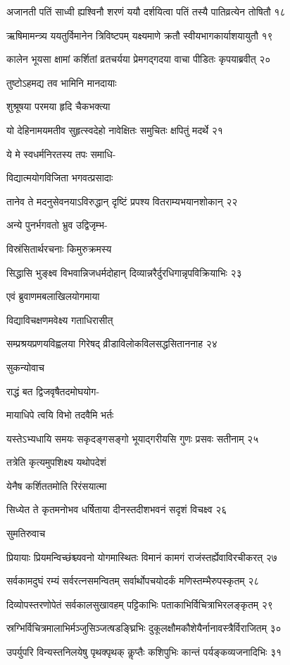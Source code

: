 अजानती पतिं साध्वी ह्यश्विनौ शरणं ययौ
दर्शयित्वा पतिं तस्यै पातिव्रत्येन तोषितौ १८

ऋषिमामन्त्र्य ययतुर्विमानेन त्रिविष्टपम्
यक्ष्यमाणे क्रतौ स्वीयभागकार्याशयायुतौ १९

कालेन भूयसा क्षामां कर्शितां व्रतचर्यया
प्रेमगद्गदया वाचा पीडितः कृपयाब्रवीत् २०

तुष्टोऽहमद्य तव भामिनि मानदायाः

शुश्रूषया परमया हृदि चैकभक्त्या

यो देहिनामयमतीव सुहृत्स्वदेहो
नावेक्षितः समुचितः क्षपितुं मदर्थे २१

ये मे स्वधर्मनिरतस्य तपः समाधि-

विद्यात्मयोगविजिता भगवत्प्रसादाः

तानेव ते मदनुसेवनयाऽविरुद्धान्
दृष्टिं प्रपश्य वितराम्यभयानशोकान् २२

अन्ये पुनर्भगवतो भ्रुव उद्विजृम्भ-

विस्रंसितार्थरचनाः किमुरुक्रमस्य

सिद्धासि भुङ्क्ष्व विभवान्निजधर्मदोहान्
दिव्यान्नरैर्दुरधिगान्नृपविक्रियाभिः २३

एवं ब्रुवाणमबलाखिलयोगमाया

विद्याविचक्षणमवेक्ष्य गताधिरासीत्

सम्प्रश्रयप्रणयविह्वलया गिरेषद्
व्रीडाविलोकविलसद्धसिताननाह २४

सुकन्योवाच

राद्धं बत द्विजवृषैतदमोघयोग-

मायाधिपे त्वयि विभो तदवैमि भर्तः

यस्तेऽभ्यधायि समयः सकृदङ्गसङ्गो
भूयाद्गरीयसि गुणः प्रसवः सतीनाम् २५

तत्रेति कृत्यमुपशिक्ष्य यथोपदेशं

येनैष कर्शिततमोति रिरंसयात्मा

सिध्येत ते कृतमनोभव धर्षिताया
दीनस्तदीशभवनं सदृशं विचक्ष्व २६

सुमतिरुवाच

प्रियायाः प्रियमन्विच्छंश्च्यवनो योगमास्थितः
विमानं कामगं राजंस्तर्ह्येवाविरचीकरत् २७

सर्वकामदुघं रम्यं सर्वरत्नसमन्वितम्
सर्वार्थोपचयोदर्कं मणिस्तम्भैरुपस्कृतम् २८

दिव्योपस्तरणोपेतं सर्वकालसुखावहम्
पट्टिकाभिः पताकाभिर्विचित्राभिरलङ्कृतम् २९

स्रग्भिर्विचित्रमालाभिर्मञ्जुसिञ्जत्षडङ्घ्रिभिः
दुकूलक्षौमकौशेयैर्नानावस्त्रैर्विराजितम् ३०

उपर्युपरि विन्यस्तनिलयेषु पृथक्पृथक्
कॢप्तैः कशिपुभिः कान्तं पर्यङ्कव्यजनादिभिः ३१

